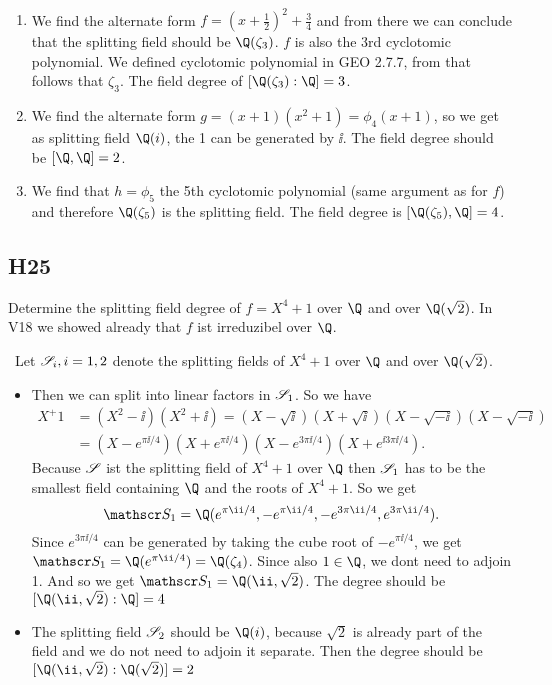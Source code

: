 \begin{solution}\
		\begin{enumerate}
			\item We find the alternate form $f = (x+\frac{1}{2})^2 + \frac{3}{4}$ and from there we can conclude that the 	splitting field should be $\Q(\zeta_3)$. $f$ is also the 3rd cyclotomic polynomial. We defined cyclotomic polynomial in GEO 2.7.7, from that follows that $\zeta_3$. The field degree of $[\Q(\zeta_3):\Q] = 3$.
			\item We find the alternate form $g = (x+1)(x^2 +1) = \phi_4(x+1)$, so we get as splitting field $\Q(i)$, the 1 can be generated by $\ii$. The field degree should be $[\Q, \Q] = 2$.
			\item We find that $h = \phi_5$ the 5th cyclotomic polynomial (same argument as for $f$) and therefore $\Q(\zeta_5)$ is the splitting field. The field degree is $[\Q(\zeta_5), \Q] = 4$.
		\end{enumerate}
\end{solution}

\subsection{H25}
Determine the splitting field degree of $f = X^4 + 1$ over $\Q$ and over $\Q(\sqrt{2})$. In V18 we showed already that $f$ ist irreduzibel over $\Q$.
\begin{solution}\
	Let $\mathscr S_i, i =1,2$ denote the splitting fields of $X^4 +1$ over $\Q$ and over $\Q(\sqrt{2})$.
	\begin{itemize}
		\item Then we can split into linear factors in $\mathscr S_1$.
		So we have
		\begin{align*}
		X^ +1 &= (X^2 -\ii)(X^2 +\ii) = (X - \sqrt{\ii})(X+ \sqrt{\ii})(X- \sqrt{-\ii})(X- \sqrt{-\ii})\\
		&= (X-e^{\pi\ii /4})(X+e^{\pi\ii /4})(X-e^{3\pi\ii/4})(X+e^{\ii 3\pi\ii/4}).
		\end{align*}
		Because $\mathscr S$ ist the splitting field of $X^4 +1$ over $\Q$ then $\mathscr S_1$ has to be the smallest field containing $\Q$ and the roots of $X^4 +1$. So we get
		\[
		\Split_1 = \Q(e^{\pi\ii /4}, -e^{\pi\ii /4}, -e^{3\pi\ii/4}, e^{3\pi\ii/4}).
		\]
		Since $e^{3\pi\ii/4}$ can be generated by taking the cube root of $-e^{\pi\ii/4}$, we get $\Split_1 = \Q(e^{\pi\ii/4}) = \Q(\zeta_4)$. Since also $1 \in \Q$, we dont need to adjoin 1. And so we get $\Split_1 = \Q(\ii, \sqrt{2})$. The degree should be $[\Q(\ii, \sqrt{2}):\Q] = 4$
		\item The splitting field $\mathscr S_2$ should be $\Q(i)$, because $\sqrt{2}$ is already part of the field and we do not need to adjoin it separate. Then the degree should be $[\Q(\ii, \sqrt{2}):\Q(\sqrt{2})] = 2$ %
	\end{itemize}
\end{solution}
